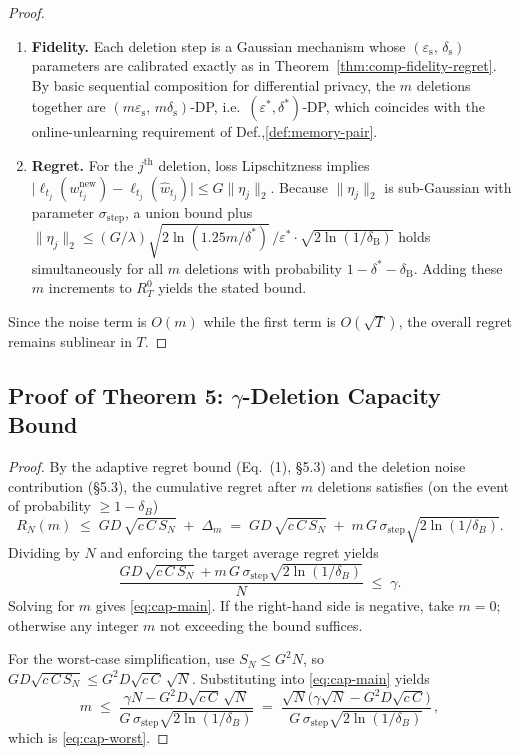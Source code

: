 \documentclass{article}
\theoremstyle{ssltheorem}
\begin{document}
\begin{proof}

\begin{enumerate}
    \item \textbf{Fidelity.} Each deletion step is a Gaussian mechanism whose $(\varepsilon_{\text{s}},\, \delta_{\text{s}})$ parameters are calibrated exactly as in Theorem~\ref{thm:comp-fidelity-regret}.
By basic sequential composition for differential privacy, the $m$ deletions together are $(m\varepsilon_{\text{s}},\,m\delta_{\text{s}})$‑DP, i.e.\
$(\varepsilon^{*},\delta^{*})$‑DP, which coincides with the online-unlearning requirement of Def.,\ref{def:memory-pair}.
\item \textbf{Regret.} For the $j^{\text{th}}$ deletion, loss Lipschitzness implies 
$\bigl|\ell_{t_{j}}(w_{t_{j}}^{\text{new}})-\ell_{t_{j}}(\hat w_{t_{j}})\bigr|
      \le G\lVert\eta_{j}\rVert_{2}$.
Because $\lVert\eta_{j}\rVert_{2}$ is sub-Gaussian with parameter
$\sigma_{\text{step}}$, a union bound plus
$\|\eta_{j}\|_{2} \le
  (G/\lambda)\sqrt{2\ln(1.25m/\delta^{*})}\,/\varepsilon^{*}
  \cdot\sqrt{2\ln(1/\delta_{\mathrm{B}})}$
holds simultaneously for all $m$ deletions
with probability $1-\delta^{*}-\delta_{\mathrm{B}}$.
Adding these $m$ increments to $R_{T}^{0}$ yields the stated bound.
\end{enumerate}

Since the noise term is $O(m)$ while the first term is
$O(\sqrt{T})$, the overall regret remains sublinear in $T$.
\end{proof}

\subsection{Proof of Theorem 5: $\gamma$-Deletion Capacity Bound}
\begin{proof}
By the adaptive regret bound (Eq.~(1), §5.3) and the deletion noise contribution (§5.3),
the cumulative regret after $m$ deletions satisfies (on the event of probability $\ge 1-\delta_B$)
$$
R_{N}(m) \;\le\;
GD\,\sqrt{c\,C\,S_{N}} \;+\; \Delta_m
\;=\; GD\,\sqrt{c\,C\,S_{N}} \;+\; m\,G\,\sigma_{\text{step}}\sqrt{2\ln(1/\delta_B)}.
$$
Dividing by $N$ and enforcing the target average regret yields
$$
\frac{GD\,\sqrt{c\,C\,S_{N}} + m\,G\,\sigma_{\text{step}}\sqrt{2\ln(1/\delta_B)}}{N}
\;\le\; \gamma.
$$
Solving for $m$ gives \eqref{eq:cap-main}. If the right-hand side is negative, take $m=0$;
otherwise any integer $m$ not exceeding the bound suffices.

For the worst-case simplification, use $S_{N}\le G^{2} N$, so
$GD\sqrt{c\,C\,S_{N}}\le G^{2} D \sqrt{c\,C}\,\sqrt{N}$.
Substituting into \eqref{eq:cap-main} yields
$$
m \;\le\; \frac{\gamma N - G^{2} D \sqrt{c\,C}\,\sqrt{N}}
{G\,\sigma_{\text{step}}\sqrt{2\ln(1/\delta_B)}}
\;=\; \frac{\sqrt{N}\bigl(\gamma\sqrt{N}-G^{2} D \sqrt{c\,C}\bigr)}
{G\,\sigma_{\text{step}}\sqrt{2\ln(1/\delta_B)}}\,,
$$
which is \eqref{eq:cap-worst}.
\end{proof}
\end{document}
